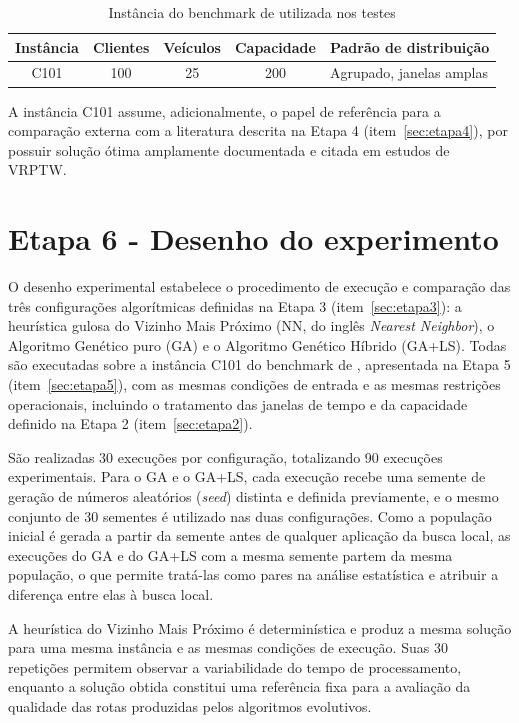 \begin{table}[htb]
	\centering
	\caption{Instância do benchmark de  utilizada nos testes}
	\label{tab:instancias}
	\begin{tabular}{ccccl}
		\toprule
		Instância & Clientes & Veículos & Capacidade & Padrão de distribuição \\
		\midrule
		C101      & 100      & 25       & 200        & Agrupado, janelas amplas \\
		\bottomrule
	\end{tabular}
\end{table}

A instância C101 assume, adicionalmente, o papel de referência para a comparação
externa com a literatura descrita na Etapa 4 (item~\ref{sec:etapa4}), por possuir
solução ótima amplamente documentada e citada em estudos de VRPTW.

\section{Etapa 6 - Desenho do experimento}
\label{sec:etapa6}

O desenho experimental estabelece o procedimento de execução e comparação das três
configurações algorítmicas definidas na Etapa 3 (item~\ref{sec:etapa3}): a heurística
gulosa do Vizinho Mais Próximo (NN, do inglês \textit{Nearest Neighbor}), o Algoritmo
Genético puro (GA) e o Algoritmo Genético Híbrido (GA+LS). Todas são executadas sobre a
instância C101 do benchmark de , apresentada na Etapa 5
(item~\ref{sec:etapa5}), com as mesmas condições de entrada e as mesmas restrições
operacionais, incluindo o tratamento das janelas de tempo e da capacidade definido na
Etapa 2 (item~\ref{sec:etapa2}).

São realizadas 30 execuções por configuração, totalizando 90 execuções experimentais.
Para o GA e o GA+LS, cada execução recebe uma semente de geração de números aleatórios
(\textit{seed}) distinta e definida previamente, e o mesmo conjunto de 30 sementes é
utilizado nas duas configurações. Como a população inicial é gerada a partir da semente
antes de qualquer aplicação da busca local, as execuções do GA e do GA+LS com a mesma
semente partem da mesma população, o que permite tratá-las como pares na análise
estatística e atribuir a diferença entre elas à busca local.

A heurística do Vizinho Mais Próximo é determinística e produz a mesma solução para uma
mesma instância e as mesmas condições de execução. Suas 30 repetições permitem observar
a variabilidade do tempo de processamento, enquanto a solução obtida constitui uma
referência fixa para a avaliação da qualidade das rotas produzidas pelos algoritmos
evolutivos.

